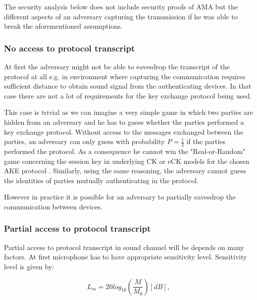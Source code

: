\documentclass[11pt,titlepage]{article}
\theoremstyle{plain}
\begin{document}
\vspace{5mm}

The security analysis below does not include security proofs of AMA but the different aspects of an adversary capturing the transmission if he was able to break the aforementioned assumptions.

\subsubsection{No access to protocol transcript}
At first the adversary might not be able to eavesdrop the transcript of the protocol at all e.g. in environment where capturing the communication requires sufficient distance to obtain sound signal from the authenticating devices. In that case there are not a lot of requirements for the key exchange protocol being used.

\vspace{5mm}

This case is trivial as we can imagine a very simple game in which two parties are hidden from an adversary and he has to guess whether the parties performed a key exchange protocol. Without access to the messages exchanged between the parties, an adversary can only guess with probability $P = \frac{1}{2}$ if the parties performed the protocol. As a consequence he cannot win the "Real-or-Random" game concerning the session key in underlying CK or eCK models for the chosen AKE protocol \cite{key_exchange, efficient_eck, security_canetti_krawczyk}. Similarly, using the same reasoning, the adversary cannot guess the identities of parties mutually authenticating in the protocol. 

\vspace{5mm}

However in practice it is possible for an adversary to partially eavesdrop the communication between devices.

\subsubsection{Partial access to protocol transcript}

Partial access to protocol transcript in sound channel will be depends on many factors. At first microphone has to have appropriate sensitivity level. Sensitivity level is given by:

\begin{equation}
	L_m = 20 log_{10}\left(\frac{M}{M_0}\right)[dB],
\end{equation}
\end{document}
